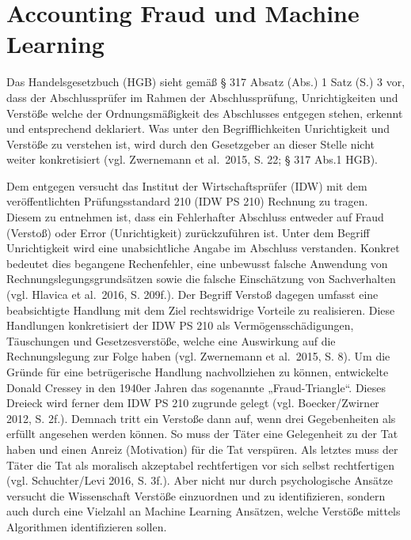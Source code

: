 \documentclass[a4paper, nobind]{templates/ociamthesis}
\begin{document}
\hypertarget{AccFraud_and_ML}{%
\chapter{Accounting Fraud und Machine Learning}\label{AccFraud_and_ML}}

Das Handelsgesetzbuch (HGB) sieht gemäß § 317 Absatz (Abs.) 1 Satz (S.) 3 vor, dass der Abschlussprüfer im Rahmen der Abschlussprüfung, Unrichtigkeiten und Verstöße welche der Ordnungsmäßigkeit des Abschlusses entgegen stehen, erkennt und entsprechend deklariert. Was unter den Begrifflichkeiten Unrichtigkeit und Verstöße zu verstehen ist, wird durch den Gesetzgeber an dieser Stelle nicht weiter konkretisiert (vgl. Zwernemann et al.~2015, S. 22; § 317 Abs.1 HGB).

Dem entgegen versucht das Institut der Wirtschaftsprüfer (IDW) mit dem veröffentlichten Prüfungsstandard 210 (IDW PS 210) Rechnung zu tragen. Diesem zu entnehmen ist, dass ein Fehlerhafter Abschluss entweder auf Fraud (Verstoß) oder Error (Unrichtigkeit) zurückzuführen ist. Unter dem Begriff Unrichtigkeit wird eine unabsichtliche Angabe im Abschluss verstanden. Konkret bedeutet dies begangene Rechenfehler, eine unbewusst falsche Anwendung von Rechnungslegungsgrundsätzen sowie die falsche Einschätzung von Sachverhalten (vgl. Hlavica et al.~2016, S. 209f.). Der Begriff Verstoß dagegen umfasst eine beabsichtigte Handlung mit dem Ziel rechtswidrige Vorteile zu realisieren. Diese Handlungen konkretisiert der IDW PS 210 als Vermögensschädigungen, Täuschungen und Gesetzesverstöße, welche eine Auswirkung auf die Rechnungslegung zur Folge haben (vgl. Zwernemann et al.~2015, S. 8).
Um die Gründe für eine betrügerische Handlung nachvollziehen zu können, entwickelte Donald Cressey in den 1940er Jahren das sogenannte „Fraud-Triangle``. Dieses Dreieck wird ferner dem IDW PS 210 zugrunde gelegt (vgl. Boecker/Zwirner 2012, S. 2f.). Demnach tritt ein Verstoße dann auf, wenn drei Gegebenheiten als erfüllt angesehen werden können. So muss der Täter eine Gelegenheit zu der Tat haben und einen Anreiz (Motivation) für die Tat verspüren. Als letztes muss der Täter die Tat als moralisch akzeptabel rechtfertigen vor sich selbst rechtfertigen (vgl. Schuchter/Levi 2016, S. 3f.).
Aber nicht nur durch psychologische Ansätze versucht die Wissenschaft Verstöße einzuordnen und zu identifizieren, sondern auch durch eine Vielzahl an Machine Learning Ansätzen, welche Verstöße mittels Algorithmen identifizieren sollen.
\end{document}
